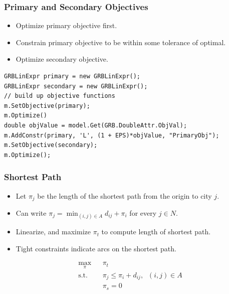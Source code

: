 \documentclass[12pt,handout]{beamer}
\begin{document}
\begin{frame} [containsverbatim]
\frametitle{Primary and Secondary Objectives}
\begin{itemize}
\item Optimize primary objective first.
\item Constrain primary objective to be within some tolerance of optimal.
\item Optimize secondary objective.
\end{itemize}
\small
\begin{verbatim}
GRBLinExpr primary = new GRBLinExpr();
GRBLinExpr secondary = new GRBLinExpr();
// build up objective functions
m.SetObjective(primary);
m.Optimize()
double objValue = model.Get(GRB.DoubleAttr.ObjVal);
m.AddConstr(primary, 'L', (1 + EPS)*objValue, "PrimaryObj");
m.SetObjective(secondary);
m.Optimize();
\end{verbatim}
\end{frame}


\begin{frame}
\frametitle{Shortest Path}
\begin{itemize}
\item Let $\pi_j$ be the length of the shortest path from the origin to city $j$.
\item Can write $\pi_j = \min_{(i,j) \in A} d_{ij} + \pi_i$ for every $j \in N$.
\item Linearize, and maximize $\pi_t$ to compute length of shortest path.
\item Tight constraints indicate arcs on the shortest path.
\end{itemize}
\begin{eqnarray}
\max_{\pi} && \pi_t \nonumber \\
\mbox{s.t.} && \pi_j \le \pi_i + d_{ij},\;\;(i,j) \in A \nonumber \\
&& \pi_s = 0 \nonumber
\end{eqnarray}
\end{frame}
\end{document}
